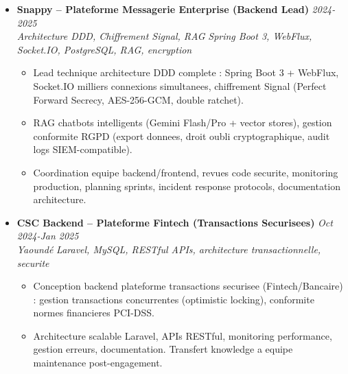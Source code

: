 \documentclass[a4paper,11pt]{article}
\begin{document}
\begin{itemize}[leftmargin=*, label={-}]
\item \textbf{Snappy -- Plateforme Messagerie Enterprise (Backend Lead)} \hfill \textit{2024-2025} \\
\textit{Architecture DDD, Chiffrement Signal, RAG} \hfill \textit{Spring Boot 3, WebFlux, Socket.IO, PostgreSQL, RAG, encryption}
\vspace{-2pt}
    \begin{itemize}[leftmargin=0.4cm, nosep, label=\tiny$\bullet$]
        \item \small{Lead technique architecture DDD complete : Spring Boot 3 + WebFlux, Socket.IO milliers connexions simultanees, chiffrement Signal (Perfect Forward Secrecy, AES-256-GCM, double ratchet).}
        \item \small{RAG chatbots intelligents (Gemini Flash/Pro + vector stores), gestion conformite RGPD (export donnees, droit oubli cryptographique, audit logs SIEM-compatible).}
        \item \small{Coordination equipe backend/frontend, revues code securite, monitoring production, planning sprints, incident response protocols, documentation architecture.}
    \end{itemize}
\vspace{3pt}

\item \textbf{CSC Backend -- Plateforme Fintech (Transactions Securisees)} \hfill \textit{Oct 2024-Jan 2025} \\
\textit{Yaound\'e} \hfill \textit{Laravel, MySQL, RESTful APIs, architecture transactionnelle, securite}
\vspace{-2pt}
    \begin{itemize}[leftmargin=0.4cm, nosep, label=\tiny$\bullet$]
        \item \small{Conception backend plateforme transactions securisee (Fintech/Bancaire) : gestion transactions concurrentes (optimistic locking), conformite normes financieres PCI-DSS.}
        \item \small{Architecture scalable Laravel, APIs RESTful, monitoring performance, gestion erreurs, documentation. Transfert knowledge a equipe maintenance post-engagement.}
    \end{itemize}
\vspace{3pt}

\end{itemize}
\end{document}
